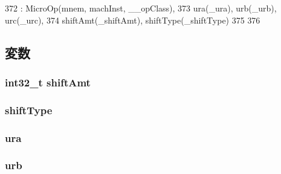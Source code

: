 \begin{DoxyCode}
372             : MicroOp(mnem, machInst, __opClass),
373               ura(_ura), urb(_urb), urc(_urc),
374               shiftAmt(_shiftAmt), shiftType(_shiftType)
375     {
376     }
\end{DoxyCode}


\subsection{変数}
\hypertarget{classArmISA_1_1MicroIntRegOp_a378dfadeb317c390962c147be928d92d}{
\subsubsection[{shiftAmt}]{\setlength{\rightskip}{0pt plus 5cm}int32\_\-t {\bf shiftAmt}}}
\label{classArmISA_1_1MicroIntRegOp_a378dfadeb317c390962c147be928d92d}
\hypertarget{classArmISA_1_1MicroIntRegOp_ae5b7df4bd366c5419743bf5f679485b9}{
\subsubsection[{shiftType}]{ {\bf shiftType}}}
\label{classArmISA_1_1MicroIntRegOp_ae5b7df4bd366c5419743bf5f679485b9}
\hypertarget{classArmISA_1_1MicroIntRegOp_a8e6cd3e234a4950e7a1a05f1b24cfee0}{
\subsubsection[{ura}]{ {\bf ura}}}
\label{classArmISA_1_1MicroIntRegOp_a8e6cd3e234a4950e7a1a05f1b24cfee0}
\hypertarget{classArmISA_1_1MicroIntRegOp_a3771d4e6da84a09dbf436d6b1af2be46}{
\subsubsection[{urb}]{ {\bf urb}}}
